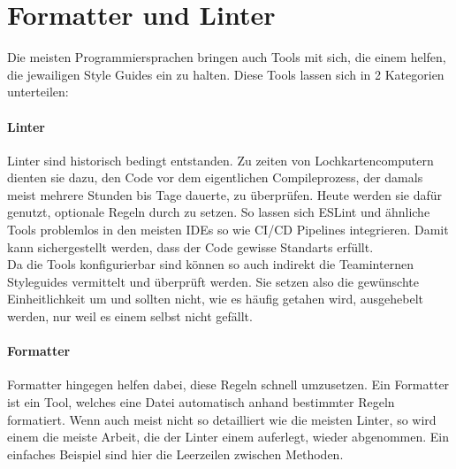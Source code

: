 \section{Formatter und Linter}
    Die meisten Programmiersprachen bringen auch Tools mit sich, die einem helfen, die jewailigen Style Guides ein zu halten.
    Diese Tools lassen sich in 2 Kategorien unterteilen:
    \paragraph{Linter}
        Linter sind historisch bedingt entstanden.
        Zu zeiten von Lochkartencomputern dienten sie dazu, den Code vor dem eigentlichen Compileprozess, der damals meist mehrere Stunden bis Tage dauerte, zu überprüfen.
        Heute werden sie dafür genutzt, optionale Regeln durch zu setzen.
        So lassen sich ESLint und ähnliche Tools problemlos in den meisten IDEs so wie CI/CD Pipelines integrieren.
        Damit kann sichergestellt werden, dass der Code gewisse Standarts erfüllt.\\
        Da die Tools konfigurierbar sind können so auch indirekt die Teaminternen Styleguides vermittelt und überprüft werden.
        Sie setzen also die gewünschte Einheitlichkeit um und sollten nicht, wie es häufig getahen wird, ausgehebelt werden, nur weil es einem selbst nicht gefällt.

    \paragraph{Formatter}
        Formatter hingegen helfen dabei, diese Regeln schnell umzusetzen.
        Ein Formatter ist ein Tool, welches eine Datei automatisch anhand bestimmter Regeln formatiert.
        Wenn auch meist nicht so detailliert wie die meisten Linter, so wird einem die meiste Arbeit, die der Linter einem auferlegt, wieder abgenommen.
        Ein einfaches Beispiel sind hier die Leerzeilen zwischen Methoden.